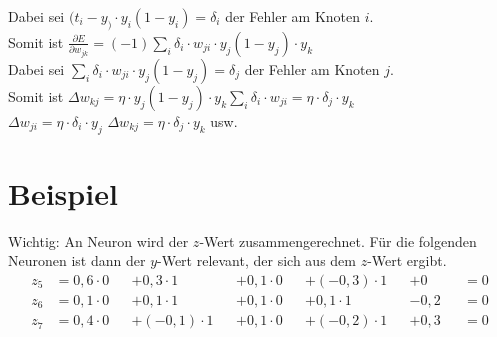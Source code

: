 Dabei sei $(t_i-y_) \cdot y_i(1-y_i) = \delta_i$ der Fehler am Knoten $i$.\\
Somit ist $\frac{\partial E}{\partial w_{jk}}=(-1) \sum_i \delta_i \cdot w_{ji} \cdot y_j(1-y_j) \cdot y_k$\\
Dabei sei $\sum_i \delta_i \cdot w_{ji} \cdot y_j(1-y_j) = \delta_j$ der Fehler am Knoten $j$.\\
Somit ist $\Delta w_{kj}=\eta \cdot y_j(1-y_j) \cdot y_k \sum_i \delta _i \cdot w_{ji} = \eta \cdot \delta_j \cdot y_k$\\
$\boxed{\Delta w_{ji}=\eta \cdot \delta_i \cdot y_j}$
$\boxed{\Delta w_{kj}=\eta \cdot \delta_j \cdot y_k}$ usw.






\section{Beispiel}
Wichtig: An Neuron wird der $z$-Wert zusammengerechnet. Für die folgenden Neuronen ist dann der $y$-Wert relevant, der sich aus dem $z$-Wert ergibt.
\begin{align*}
z_5 &= 0,6\cdot 0 &&+ 0,3 \cdot 1 &&+ 0,1 \cdot 0 &&+ (-0,3) \cdot 1 &&+ 0 &&= 0\\
z_6 &= 0,1\cdot 0 &&+ 0,1 \cdot 1 &&+ 0,1 \cdot 0 &&+ 0,1 \cdot 1 &&-0,2 &&= 0\\
z_7 &= 0,4\cdot 0 &&+ (-0,1) \cdot 1 &&+ 0,1 \cdot 0 &&+ (-0,2) \cdot 1 &&+ 0,3 &&= 0
\end{align*}
